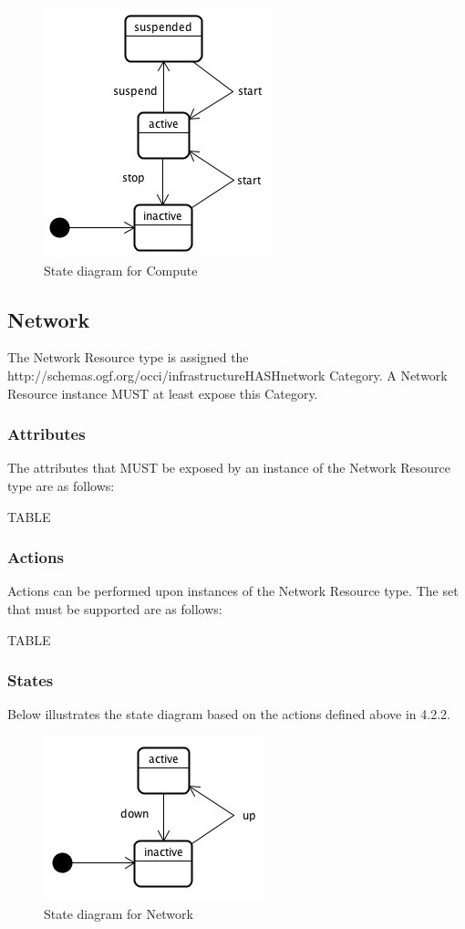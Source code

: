 \documentclass[10pt,a4paper]{article}
\begin{document}
\begin{figure}[!h]
	\centering
	\includegraphics[scale=0.4]{dia/compute-state.png}
	\caption{State diagram for Compute}
	\label{fig:compute_state}
\end{figure}

\subsection{Network}
The Network Resource type is assigned the http://schemas.ogf.org/occi/infrastructureHASHnetwork Category. A Network Resource instance MUST at least expose this Category.

\subsubsection{Attributes}
The attributes that MUST be exposed by an instance of the Network Resource type are as follows:

TABLE

\subsubsection{Actions}
Actions can be performed upon instances of the Network Resource type. The set that must be supported are as follows:

TABLE

\subsubsection{States}
Below illustrates the state diagram based on the actions defined above in 4.2.2.

\begin{figure}[!h]
	\centering
	\includegraphics[scale=0.4]{dia/network-state.png}
	\caption{State diagram for Network}
	\label{fig:network_state}
\end{figure}
\end{document}
